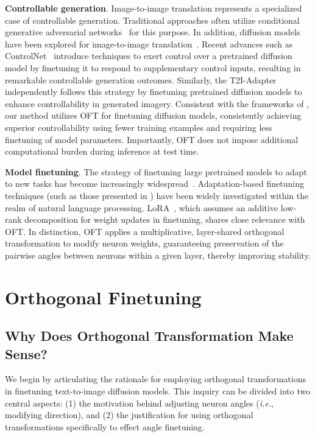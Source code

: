 \textbf{Controllable generation}. Image-to-image translation represents a specialized case of controllable generation. Traditional approaches often utilize conditional generative adversarial networks~\cite{isola2017image,zhu2017toward,wang2018high,park2019semantic,choi2018stargan} for this purpose. In addition, diffusion models have been explored for image-to-image translation~\cite{saharia2022palette,voynov2022sketch,wang2022pretraining}. Recent advances such as ControlNet~\cite{zhang2023adding} introduce techniques to exert control over a pretrained diffusion model by finetuning it to respond to supplementary control inputs, resulting in remarkable controllable generation outcomes. Similarly, the T2I-Adapter~\cite{mou2023t2i} independently follows this strategy by finetuning pretrained diffusion models to enhance controllability in generated imagery. Consistent with the frameworks of \cite{zhang2023adding,mou2023t2i}, our method utilizes OFT for finetuning diffusion models, consistently achieving superior controllability using fewer training examples and requiring less finetuning of model parameters. Importantly, OFT does not impose additional computational burden during inference at test time.

\textbf{Model finetuning}. The strategy of finetuning large pretrained models to adapt to new tasks has become increasingly widespread~\cite{devlin2018bert,brown2020language,he2022masked}. Adaptation-based finetuning techniques (such as those presented in \cite{hulora2022,houlsby2019parameter,pfeiffer2020adapterfusion}) have been widely investigated within the realm of natural language processing. LoRA~\cite{hulora2022}, which assumes an additive low-rank decomposition for weight updates in finetuning, shares close relevance with OFT. In distinction, OFT applies a multiplicative, layer-shared orthogonal transformation to modify neuron weights, guaranteeing preservation of the pairwise angles between neurons within a given layer, thereby improving stability.

\section{Orthogonal Finetuning}

\subsection{Why Does Orthogonal Transformation Make Sense?}

We begin by articulating the rationale for employing orthogonal transformations in finetuning text-to-image diffusion models. This inquiry can be divided into two central aspects: (1) the motivation behind adjusting neuron angles (\emph{i.e.}, modifying direction), and (2) the justification for using orthogonal transformations specifically to effect angle finetuning.

